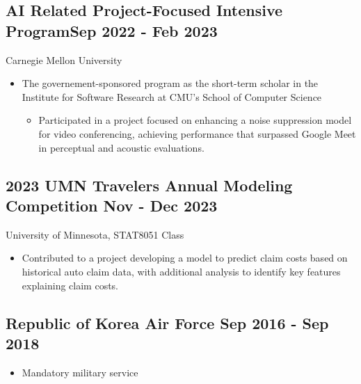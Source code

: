 \documentclass[a4paper,12pt]{article}
\begin{document}


\vspace*{10pt}
\subsection{{AI Related Project-Focused Intensive Program}\hfill Sep 2022 - Feb 2023}

\vspace*{2pt}
Carnegie Mellon University
\begin{itemize}
    \item The governement-sponsored program as the short-term scholar in the Institute for Software Research at CMU's School of Computer Science  
    \begin{itemize}
        \item Participated in a project focused on enhancing a noise suppression model for video conferencing, achieving performance that surpassed Google Meet in perceptual and acoustic evaluations.
    \end{itemize}
\end{itemize}

\vspace*{6pt}
\subsection{{2023 UMN Travelers Annual Modeling Competition} \hfill Nov - Dec 2023}

\vspace*{2pt}
University of Minnesota, STAT8051 Class
\begin{itemize}
    \item Contributed to a project developing a model to predict claim costs based on historical auto claim data, with additional analysis to identify key features explaining claim costs.
\end{itemize}

\vspace*{6pt}
\subsection{{Republic of Korea Air Force} \hfill Sep 2016 - Sep 2018}

\vspace*{2pt}
\begin{itemize}
    \item Mandatory military service
\end{itemize}
\end{document}
